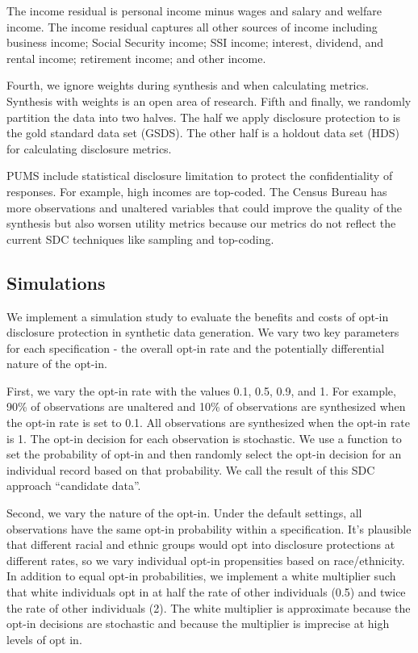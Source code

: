 \documentclass[
]{urban-formatting}
\begin{document}
The income residual is personal income minus wages and salary and
welfare income. The income residual captures all other sources of income
including business income; Social Security income; SSI income; interest,
dividend, and rental income; retirement income; and other income.

Fourth, we ignore weights during synthesis and when calculating metrics.
Synthesis with weights is an open area of research. Fifth and finally,
we randomly partition the data into two halves. The half we apply
disclosure protection to is the gold standard data set (GSDS). The other
half is a holdout data set (HDS) for calculating disclosure metrics.

PUMS include statistical disclosure limitation to protect the
confidentiality of responses. For example, high incomes are top-coded.
The Census Bureau has more observations and unaltered variables that
could improve the quality of the synthesis but also worsen utility
metrics because our metrics do not reflect the current SDC techniques
like sampling and top-coding.

\subsection{Simulations}

We implement a simulation study to evaluate the benefits and costs of
opt-in disclosure protection in synthetic data generation. We vary two
key parameters for each specification - the overall opt-in rate and the
potentially differential nature of the opt-in.

First, we vary the opt-in rate with the values 0.1, 0.5, 0.9, and 1. For
example, 90\% of observations are unaltered and 10\% of observations are
synthesized when the opt-in rate is set to 0.1. All observations are
synthesized when the opt-in rate is 1. The opt-in decision for each
observation is stochastic. We use a function to set the probability of
opt-in and then randomly select the opt-in decision for an individual
record based on that probability. We call the result of this SDC
approach ``candidate data''.

Second, we vary the nature of the opt-in. Under the default settings,
all observations have the same opt-in probability within a
specification. It's plausible that different racial and ethnic groups
would opt into disclosure protections at different rates, so we vary
individual opt-in propensities based on race/ethnicity. In addition to
equal opt-in probabilities, we implement a white multiplier such that
white individuals opt in at half the rate of other individuals (0.5) and
twice the rate of other individuals (2). The white multiplier is
approximate because the opt-in decisions are stochastic and because the
multiplier is imprecise at high levels of opt in.
\end{document}
